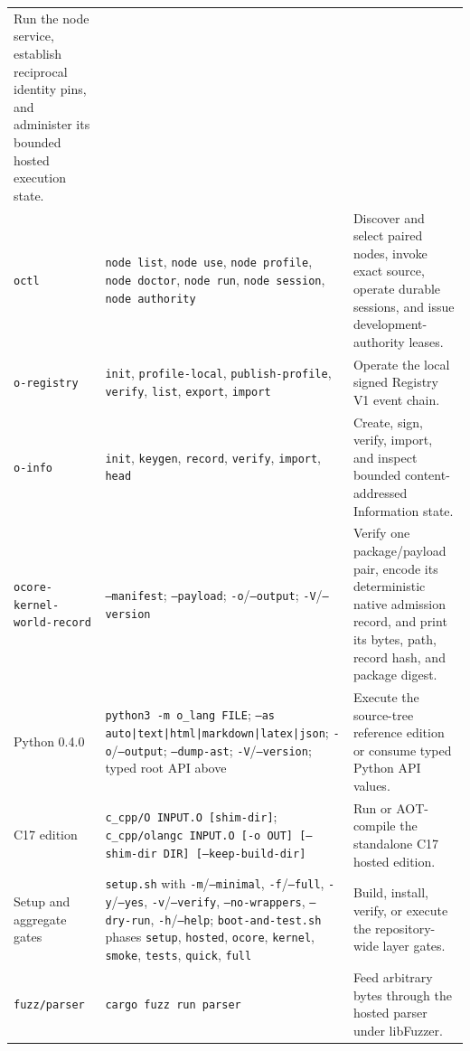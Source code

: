 \documentclass[11pt,oneside]{article}
\begin{document}
\begin{longtable}{P{0.18\textwidth} P{0.42\textwidth} P{0.32\textwidth}}
Run the node service, establish reciprocal identity pins, and administer its
bounded hosted execution state. \\
\texttt{octl} & \texttt{node list}, \texttt{node use},
\texttt{node profile}, \texttt{node doctor}, \texttt{node run},
\texttt{node session}, \texttt{node authority} &
Discover and select paired nodes, invoke exact source, operate durable
sessions, and issue development-authority leases. \\
\texttt{o-registry} & \texttt{init}, \texttt{profile-local},
\texttt{publish-profile}, \texttt{verify}, \texttt{list}, \texttt{export},
\texttt{import} &
Operate the local signed Registry V1 event chain. \\
\texttt{o-info} & \texttt{init}, \texttt{keygen}, \texttt{record},
\texttt{verify}, \texttt{import}, \texttt{head} &
Create, sign, verify, import, and inspect bounded content-addressed
Information state. \\
\texttt{ocore-kernel-}\newline\texttt{world-record} &
\texttt{--manifest}; \texttt{--payload}; \texttt{-o}/\texttt{--output};
\texttt{-V}/\texttt{--version} &
Verify one package/payload pair, encode its deterministic native admission
record, and print its bytes, path, record hash, and package digest. \\
Python 0.4.0 & \texttt{python3 -m o\_lang FILE}; \texttt{--as
auto|text|html|markdown|latex|json}; \texttt{-o}/\texttt{--output};
\texttt{--dump-ast}; \texttt{-V}/\texttt{--version}; typed root API above &
Execute the source-tree reference edition or consume typed Python API values. \\
C17 edition & \texttt{c\_cpp/O INPUT.O [shim-dir]};
\texttt{c\_cpp/olangc INPUT.O [-o OUT] [--shim-dir DIR]
[--keep-build-dir]} &
Run or AOT-compile the standalone C17 hosted edition. \\
Setup and aggregate gates & \texttt{setup.sh} with
\texttt{-m}/\texttt{--minimal}, \texttt{-f}/\texttt{--full},
\texttt{-y}/\texttt{--yes}, \texttt{-v}/\texttt{--verify},
\texttt{--no-wrappers}, \texttt{--dry-run}, \texttt{-h}/\texttt{--help};
\texttt{boot-and-test.sh}
phases \texttt{setup}, \texttt{hosted}, \texttt{ocore}, \texttt{kernel},
\texttt{smoke}, \texttt{tests}, \texttt{quick}, \texttt{full} &
Build, install, verify, or execute the repository-wide layer gates. \\
\texttt{fuzz/parser} & \texttt{cargo fuzz run parser} &
Feed arbitrary bytes through the hosted parser under libFuzzer. \\
\bottomrule
\end{longtable}
\end{document}
